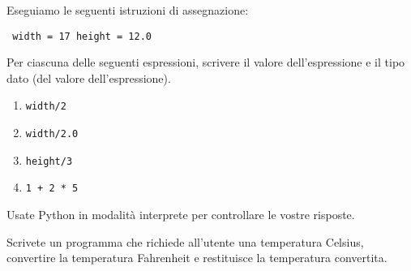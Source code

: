 \begin{ex} Eseguiamo le seguenti istruzioni di assegnazione:

\begin{verbatim} width = 17 height = 12.0 \end{verbatim}

Per ciascuna delle seguenti espressioni, scrivere il valore dell'espressione e il tipo dato (del valore dell'espressione).

\begin{enumerate}

\item {\tt width/2}

\item {\tt width/2.0}

\item {\tt height/3}

\item {\tt 1 + 2 * 5}

\end{enumerate}

Usate Python in modalit\`{a} interprete per controllare le vostre risposte.
\end{ex}

\begin{ex} Scrivete un programma che richiede all'utente una temperatura Celsius, convertire la temperatura Fahrenheit e restituisce la temperatura convertita.
\end{ex}


